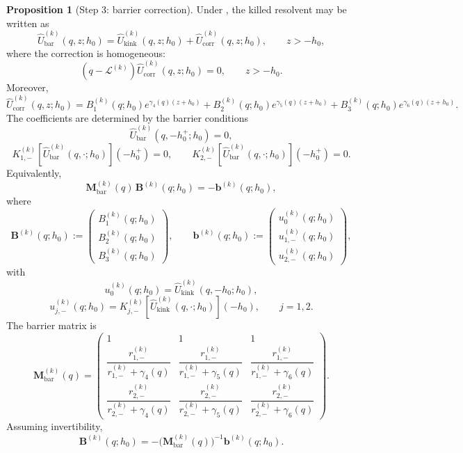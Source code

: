\documentclass{article}
\theoremstyle{definition}
\newtheorem{proposition}{Proposition}[section]
\begin{document}
\begin{proposition}[Step 3: barrier correction]\label{prop:Ubar}
Under , the killed resolvent may be written as
\[
\widehat U_{\mathrm{bar}}^{(k)}(q,z;h_0)
=
\widehat U_{\mathrm{kink}}^{(k)}(q,z;h_0)
+
\widehat U_{\mathrm{corr}}^{(k)}(q,z;h_0),
\qquad z>-h_0,
\]
where the correction is homogeneous:
\[
(q-\mathcal L^{(k)})\widehat U_{\mathrm{corr}}^{(k)}(q,z;h_0)=0,
\qquad z>-h_0.
\]
Moreover,
\[
\boxed{
\widehat U_{\mathrm{corr}}^{(k)}(q,z;h_0)
=
B_1^{(k)}(q;h_0)e^{\gamma_4(q)(z+h_0)}
+
B_2^{(k)}(q;h_0)e^{\gamma_5(q)(z+h_0)}
+
B_3^{(k)}(q;h_0)e^{\gamma_6(q)(z+h_0)}.
}
\]
The coefficients are determined by the barrier conditions
\[
\widehat U_{\mathrm{bar}}^{(k)}(q,-h_0^+;h_0)=0,
\]
\[
K_{1,-}^{(k)}\!\left[\widehat U_{\mathrm{bar}}^{(k)}(q,\cdot;h_0)\right](-h_0^+)=0,
\qquad
K_{2,-}^{(k)}\!\left[\widehat U_{\mathrm{bar}}^{(k)}(q,\cdot;h_0)\right](-h_0^+)=0.
\]
Equivalently,
\[
\mathbf M_{\mathrm{bar}}^{(k)}(q)\,\mathbf B^{(k)}(q;h_0)
=
-\mathbf b^{(k)}(q;h_0),
\]
where
\[
\mathbf B^{(k)}(q;h_0):=
\begin{pmatrix}
B_1^{(k)}(q;h_0)\\
B_2^{(k)}(q;h_0)\\
B_3^{(k)}(q;h_0)
\end{pmatrix},
\qquad
\mathbf b^{(k)}(q;h_0):=
\begin{pmatrix}
u_0^{(k)}(q;h_0)\\
u_{1,-}^{(k)}(q;h_0)\\
u_{2,-}^{(k)}(q;h_0)
\end{pmatrix},
\]
with
\[
u_0^{(k)}(q;h_0)=\widehat U_{\mathrm{kink}}^{(k)}(q,-h_0;h_0),
\]
\[
u_{j,-}^{(k)}(q;h_0)
=
K_{j,-}^{(k)}\!\left[\widehat U_{\mathrm{kink}}^{(k)}(q,\cdot;h_0)\right](-h_0),
\qquad j=1,2.
\]
The barrier matrix is
\[
\boxed{
\mathbf M_{\mathrm{bar}}^{(k)}(q)=
\begin{pmatrix}
1 & 1 & 1\\[6pt]
\dfrac{r_{1,-}^{(k)}}{r_{1,-}^{(k)}+\gamma_4(q)} &
\dfrac{r_{1,-}^{(k)}}{r_{1,-}^{(k)}+\gamma_5(q)} &
\dfrac{r_{1,-}^{(k)}}{r_{1,-}^{(k)}+\gamma_6(q)}\\[12pt]
\dfrac{r_{2,-}^{(k)}}{r_{2,-}^{(k)}+\gamma_4(q)} &
\dfrac{r_{2,-}^{(k)}}{r_{2,-}^{(k)}+\gamma_5(q)} &
\dfrac{r_{2,-}^{(k)}}{r_{2,-}^{(k)}+\gamma_6(q)}
\end{pmatrix}.
}
\]
Assuming invertibility,
\[
\mathbf B^{(k)}(q;h_0)
=
-\big(\mathbf M_{\mathrm{bar}}^{(k)}(q)\big)^{-1}\mathbf b^{(k)}(q;h_0).
\]
\end{proposition}
\end{document}
